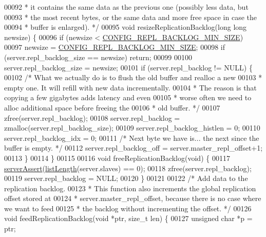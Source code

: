 \begin{DoxyCode}
{{00092 \textcolor{comment}{ * it contains the same data as the previous one (possibly less data, but}
00093 \textcolor{comment}{ * the most recent bytes, or the same data and more free space in case the}
00094 \textcolor{comment}{ * buffer is enlarged). */}
00095 \textcolor{keywordtype}{void} resizeReplicationBacklog(\textcolor{keywordtype}{long} \textcolor{keywordtype}{long} newsize) \{
00096     \textcolor{keywordflow}{if} (newsize < \hyperlink{server_8h_a72c70207aaa211eadddba3f42e73a3b5}{CONFIG\_REPL\_BACKLOG\_MIN\_SIZE})
00097         newsize = \hyperlink{server_8h_a72c70207aaa211eadddba3f42e73a3b5}{CONFIG\_REPL\_BACKLOG\_MIN\_SIZE};
00098     \textcolor{keywordflow}{if} (server.repl\_backlog\_size == newsize) \textcolor{keywordflow}{return};
00099 
00100     server.repl\_backlog\_size = newsize;
00101     \textcolor{keywordflow}{if} (server.repl\_backlog != NULL) \{
00102         \textcolor{comment}{/* What we actually do is to flush the old buffer and realloc a new}
00103 \textcolor{comment}{         * empty one. It will refill with new data incrementally.}
00104 \textcolor{comment}{         * The reason is that copying a few gigabytes adds latency and even}
00105 \textcolor{comment}{         * worse often we need to alloc additional space before freeing the}
00106 \textcolor{comment}{         * old buffer. */}
00107         zfree(server.repl\_backlog);
00108         server.repl\_backlog = zmalloc(server.repl\_backlog\_size);
00109         server.repl\_backlog\_histlen = 0;
00110         server.repl\_backlog\_idx = 0;
00111         \textcolor{comment}{/* Next byte we have is... the next since the buffer is empty. */}
00112         server.repl\_backlog\_off = server.master\_repl\_offset+1;
00113     \}
00114 \}
00115 
00116 \textcolor{keywordtype}{void} freeReplicationBacklog(\textcolor{keywordtype}{void}) \{
00117     \hyperlink{server_8h_a88114b5169b4c382df6b56506285e56a}{serverAssert}(\hyperlink{adlist_8h_afde0ab079f934670e82119b43120e94b}{listLength}(server.slaves) == 0);
00118     zfree(server.repl\_backlog);
00119     server.repl\_backlog = NULL;
00120 \}
00121 
00122 \textcolor{comment}{/* Add data to the replication backlog.}
00123 \textcolor{comment}{ * This function also increments the global replication offset stored at}
00124 \textcolor{comment}{ * server.master\_repl\_offset, because there is no case where we want to feed}
00125 \textcolor{comment}{ * the backlog without incrementing the offset. */}
00126 \textcolor{keywordtype}{void} feedReplicationBacklog(\textcolor{keywordtype}{void} *ptr, size\_t len) \{
00127     \textcolor{keywordtype}{unsigned} \textcolor{keywordtype}{char} *p = ptr;
}}
\end{DoxyCode}
